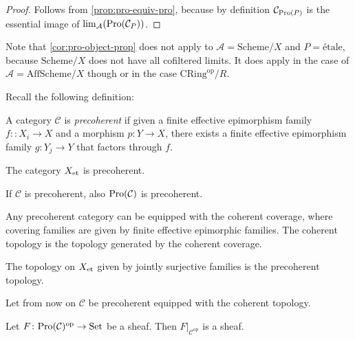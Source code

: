\begin{proof}
    Follows from \ref{prop:pro-equiv-pro}, because by definition $\mathcal{C}_{\mathrm{Pro}(P)}$ is
    the essential image of $\lim_{\mathcal{A}}(\mathrm{Pro}(\mathcal{C}_{P}))$.
\end{proof}

Note that \ref{cor:pro-object-prop} does not apply to $\mathcal{A} = \mathrm{Scheme} / X$
and $P = \mathrm{étale}$, because $\mathrm{Scheme} / X$ does not have all cofiltered limits. It
does apply in the case of $\mathcal{A} = \mathrm{AffScheme} / X$ though or in the case
$\mathrm{CRing}^{\mathrm{op}} / R$.

Recall the following definition:

\begin{definition}
    A category $\mathcal{C}$ is \emph{precoherent} if given a finite effective epimorphism family
    $f\colon \colon X_i \to X$ and a morphism $p\colon Y \to X$, there exists a finite effective epimorphism family
    $g\colon Y_j \to Y$ that factors through $f$.
\end{definition}

\begin{lemma}
    The category $X_{\mathrm{et}}$ is precoherent.
    \label{lemma:et-precoherent}
\end{lemma}

\begin{proposition}
    If $\mathcal{C}$ is precoherent, also $\mathrm{Pro}(\mathcal{C})$ is precoherent.
    \label{prop:pro-precoherent}
\end{proposition}

Any precoherent category can be equipped with the coherent coverage, where covering families are given by
finite effective epimorphic families. The coherent topology is the topology generated by the coherent coverage.

\begin{lemma}
    The topology on $X_{\mathrm{et}}$ given by jointly surjective families is the precoherent topology.
    \label{lemma:et-precoherent-topology}
\end{lemma}

Let from now on $\mathcal{C}$ be precoherent equipped with the coherent topology.

\begin{proposition}
    Let $F \colon \mathrm{Pro}(\mathcal{C})^{\mathrm{op}} \to \mathrm{Set}$ be a sheaf. Then
    $F|_{\mathcal{C}^{\mathrm{op}}}$ is a sheaf.
    \label{prop:sheaf-pro-restrict}
\end{proposition}

